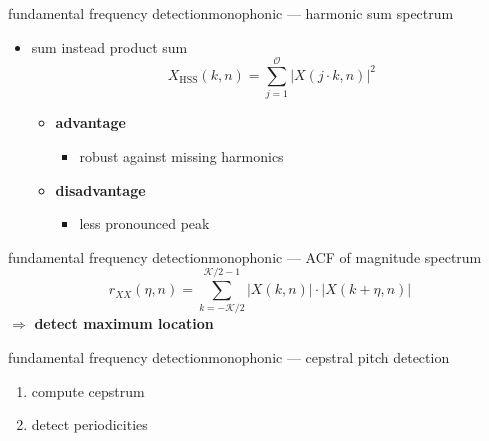 	\begin{frame}{fundamental frequency detection}{monophonic --- harmonic sum spectrum}
        \begin{itemize}
            \item   sum instead product sum
        \begin{equation*}\label{eq:hss}
            X_{\mathrm{HSS}}(k,n) = \sum\limits_{j=1}^{\mathcal{O}}{|X(j\cdot k,n)|^2} 
        \end{equation*}
        \bigskip

                \begin{itemize}
                    \item<2->   \textbf{advantage}
                        \begin{itemize}
                            \item   robust against missing harmonics
                        \end{itemize}
                    \item<3->   \textbf{disadvantage}
                        \begin{itemize}
                            \item   less pronounced peak
                        \end{itemize}
                \end{itemize}
        \end{itemize}
	\end{frame}
	
	\begin{frame}{fundamental frequency detection}{monophonic --- ACF of magnitude spectrum}
		\begin{equation*}
			r_{XX}(\eta,n) = \sum\limits_{k=-\mathcal{K}/2}^{\mathcal{K}/2-1}{|X(k,n)|\cdot |X(k+\eta,n)|}
		\end{equation*}
		\pause
		$\Rightarrow$ \textbf{detect maximum location}

	\end{frame}
	
	\begin{frame}{fundamental frequency detection}{monophonic --- cepstral pitch detection}
		\begin{enumerate}
			\item	compute cepstrum
			\item	detect periodicities
		\end{enumerate}
	\end{frame}
	
